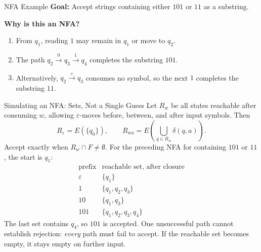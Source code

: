 \documentclass[10pt]{beamer}
\begin{document}
\begin{frame}{NFA Example}
  \small
  \textbf{Goal:} Accept strings containing either $101$ or $11$ as a
  substring.
  \pause
  \vspace{0.2cm}
  
  \begin{center}
  \end{center}
  \pause
  \textbf{Why is this an NFA?}
  \begin{enumerate}
      \item From $q_1$, reading $1$ may remain in $q_1$ or move to $q_2$.
      \item The path $q_2\xrightarrow{0}q_3\xrightarrow{1}q_4$ completes
        the substring $101$.
      \item Alternatively, $q_2\xrightarrow{\varepsilon}q_3$ consumes no
        symbol, so the next $1$ completes the substring $11$.
  \end{enumerate}
\end{frame}

\begin{frame}{Simulating an NFA: Sets, Not a Single Guess}
  \small
  Let $R_w$ be all states reachable after consuming $w$, allowing
  $\varepsilon$-moves before, between, and after input symbols. Then
  \[
    R_\varepsilon=E(\{q_0\}),\qquad
    R_{wa}=E\!\left(\bigcup_{q\in R_w}\delta(q,a)\right).
  \]
  Accept exactly when $R_w\cap F\ne\emptyset$.
  \pause
  For the preceding NFA for containing $101$ or $11$, the start is $q_1$:
  \[
    \begin{array}{c|l}
      \text{prefix} & \text{reachable set, after closure}\\
      \hline
      \varepsilon & \{q_1\}\\
      1 & \{q_1,q_2,q_3\}\\
      10 & \{q_1,q_3\}\\
      101 & \{q_1,q_2,q_3,q_4\}
    \end{array}
  \]
  \pause
  The last set contains $q_4$, so $101$ is accepted. One unsuccessful path
  cannot establish rejection: \emph{every} path must fail to accept.
  If the reachable set becomes empty, it stays empty on further input.
\end{frame}
\end{document}
